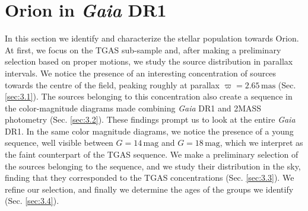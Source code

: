 \documentclass[onecolumn]{aa} %
\begin{document}
 	
\section{Orion in \textit{Gaia} DR1}\label{Sec:3}
In this section we identify and characterize the stellar population towards Orion. At first, we focus on the TGAS sub-sample and, after making a preliminary selection based on proper motions, we study the source distribution in parallax intervals. We notice the presence of an interesting concentration of sources towards the centre of the field, peaking roughly at parallax $\varpi = 2.65 \, \mathrm{mas}$ (Sec. \ref{sec:3.1}). The sources belonging to this concentration also create a sequence in the color-magnitude diagrams made combining \textit{Gaia} DR1 and 2MASS photometry (Sec. \ref{sec:3.2}). These findings prompt us to look at the entire \textit{Gaia} DR1. In the same color magnitude diagrams, we notice the presence of a young sequence, well visible between $G = 14 \, \mathrm{mag}$ and $G = 18 \, \mathrm{mag}$, which we interpret as the faint counterpart of the TGAS sequence. We make a preliminary selection of the sources belonging to the sequence, and we study their distribution in the sky, finding that they corresponded to the TGAS concentrations (Sec. \ref{sec:3.3}). We refine our selection, and finally we determine the ages of the groups we identify (Sec. \ref{sec:3.4}).
\end{document}
